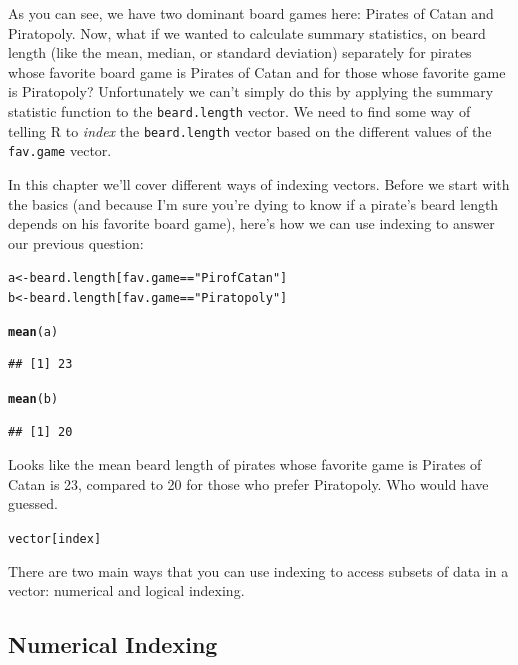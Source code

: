 \documentclass{tufte-book}\usepackage[]{graphicx}\usepackage[]{color}
\makeatletter
\newcommand{\hlstr}[1]{\textcolor[rgb]{0.192,0.494,0.8}{#1}}%
\newcommand{\hlopt}[1]{\textcolor[rgb]{0,0,0}{#1}}%
\newcommand{\hlstd}[1]{\textcolor[rgb]{0.345,0.345,0.345}{#1}}%
\newcommand{\hlkwb}[1]{\textcolor[rgb]{0.69,0.353,0.396}{#1}}%
\newcommand{\hlkwd}[1]{\textcolor[rgb]{0.737,0.353,0.396}{\textbf{#1}}}%
\newenvironment{kframe}{%
 \def\at@end@of@kframe{}%
 \ifinner\ifhmode%
  \def\at@end@of@kframe{\end{minipage}}%
  \begin{minipage}{\columnwidth}%
 \fi\fi%
 \def\FrameCommand##1{\hskip\@totalleftmargin \hskip-\fboxsep
 \colorbox{shadecolor}{##1}\hskip-\fboxsep
     \hskip-\linewidth \hskip-\@totalleftmargin \hskip\columnwidth}%
 \MakeFramed {\advance\hsize-\width
   \@totalleftmargin\z@ \linewidth\hsize
   \@setminipage}}%
 {\par\unskip\endMakeFramed%
 \at@end@of@kframe}
\newenvironment{knitrout}{}{} %
\newcommand{\newfun}[1]{\begin{LARGE} \begin{center} \texttt{#1} \end{center} \end{LARGE}}
\makeatother
\begin{document}
As you can see, we have two dominant board games here: Pirates of Catan and Piratopoly. Now, what if we wanted to calculate summary statistics, on beard length (like the mean, median, or standard deviation) separately for pirates whose favorite board game is Pirates of Catan and for those whose favorite game is Piratopoly? Unfortunately we can't simply do this by applying the summary statistic function to the \texttt{beard.length} vector. We need to find some way of telling R to \textit{index} the \texttt{beard.length} vector based on the different values of the \texttt{fav.game} vector.

In this chapter we'll cover different ways of indexing vectors. Before we start with the basics (and because I'm sure you're dying to know if a pirate's beard length depends on his favorite board game), here's how we can use indexing to answer our previous question:

\begin{knitrout}
\color{fgcolor}\begin{kframe}
\begin{alltt}
\hlstd{a} \hlkwb{<-} \hlstd{beard.length[fav.game} \hlopt{==} \hlstr{"Pir of Catan"}\hlstd{]}
\hlstd{b} \hlkwb{<-} \hlstd{beard.length[fav.game} \hlopt{==} \hlstr{"Piratopoly"}\hlstd{]}

\hlkwd{mean}\hlstd{(a)}
\end{alltt}
\begin{verbatim}
## [1] 23
\end{verbatim}
\begin{alltt}
\hlkwd{mean}\hlstd{(b)}
\end{alltt}
\begin{verbatim}
## [1] 20
\end{verbatim}
\end{kframe}
\end{knitrout}

Looks like the mean beard length of pirates whose favorite game is Pirates of Catan is 23, compared to 20 for those who prefer Piratopoly. Who would have guessed.


\newfun{vector[index]}\index{[]}

There are two main ways that you can use indexing to access subsets of data in a vector: numerical and logical indexing.

\subsection{Numerical Indexing}
\end{document}
